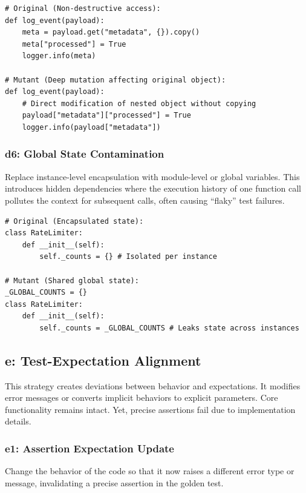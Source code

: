 \documentclass[11pt]{article}
\begin{document}
\begin{listing}[h!]
\begin{verbatim}
# Original (Non-destructive access):
def log_event(payload):
    meta = payload.get("metadata", {}).copy()
    meta["processed"] = True
    logger.info(meta)

# Mutant (Deep mutation affecting original object):
def log_event(payload):
    # Direct modification of nested object without copying
    payload["metadata"]["processed"] = True 
    logger.info(payload["metadata"])
\end{verbatim}
\caption{d5: Unintended mutation of deep data structures}
\label{code:d5}
\end{listing}

\subsubsection*{d6: Global State Contamination}
Replace instance-level encapsulation with module-level or global variables. This introduces hidden dependencies where the execution history of one function call pollutes the context for subsequent calls, often causing ``flaky'' test failures.

\begin{listing}[H]
\begin{verbatim}
# Original (Encapsulated state):
class RateLimiter:
    def __init__(self):
        self._counts = {} # Isolated per instance

# Mutant (Shared global state):
_GLOBAL_COUNTS = {}
class RateLimiter:
    def __init__(self):
        self._counts = _GLOBAL_COUNTS # Leaks state across instances
\end{verbatim}
\caption{d6: Context coupling via global state pollution}
\label{code:d6}
\end{listing}
\subsection*{e: Test-Expectation Alignment}
This strategy creates deviations between behavior and expectations. It modifies error messages or converts implicit behaviors to explicit parameters. Core functionality remains intact. Yet, precise assertions fail due to implementation details.

\subsubsection*{e1: Assertion Expectation Update}
Change the behavior of the code so that it now raises a different error type or message, invalidating a precise assertion in the golden test.
\end{document}
